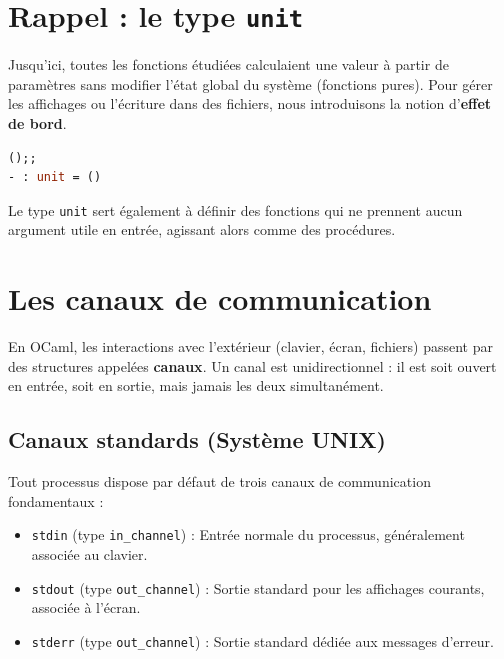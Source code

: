 \documentclass{article}
\begin{document}

\section{Rappel : le type \texttt{unit}}

Jusqu'ici, toutes les fonctions étudiées calculaient une valeur à partir de paramètres sans modifier l'état global du système (fonctions pures). Pour gérer les affichages ou l'écriture dans des fichiers, nous introduisons la notion d'\textbf{effet de bord}.


\begin{lstlisting}[language=Caml]
();;
- : unit = ()
\end{lstlisting}

\noindent Le type \texttt{unit} sert également à définir des fonctions qui ne prennent aucun argument utile en entrée, agissant alors comme des procédures.

\section{Les canaux de communication}

En OCaml, les interactions avec l'extérieur (clavier, écran, fichiers) passent par des structures appelées \textbf{canaux}. Un canal est unidirectionnel : il est soit ouvert en entrée, soit en sortie, mais jamais les deux simultanément.


\subsection{Canaux standards (Syst\`eme UNIX)}
Tout processus dispose par défaut de trois canaux de communication fondamentaux :
\begin{itemize}
    \item \texttt{stdin} (type \texttt{in\_channel}) : Entrée normale du processus, généralement associée au clavier.
    \item \texttt{stdout} (type \texttt{out\_channel}) : Sortie standard pour les affichages courants, associée à l'écran.
    \item \texttt{stderr} (type \texttt{out\_channel}) : Sortie standard dédiée aux messages d'erreur.
\end{itemize}
\end{document}
